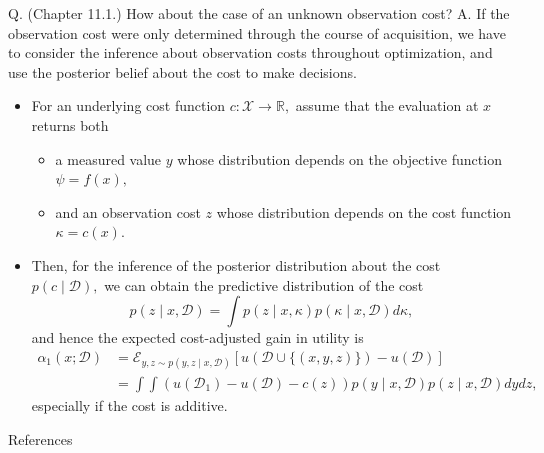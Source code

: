 \documentclass[9pt]{beamer}
\begin{document}
\begin{frame}
  Q. (Chapter 11.1.) How about the case of an unknown observation cost?
  \newline
  A. If the observation cost were only determined through the course of acquisition, we have to consider the inference about observation costs throughout optimization,
  and use the posterior belief about the cost to make decisions.
  \begin{itemize}
    \item For an underlying cost function $c: \mathcal{X} \rightarrow \mathbb{R},$ assume that
    the evaluation at $x$ returns both 
    \begin{itemize}
      \item a measured value $y$ whose distribution depends on the objective function $\psi = f(x),$
      \item and an observation cost $z$ whose distribution depends on the cost function $\kappa = c(x).$
    \end{itemize}
    \item[$\Rightarrow$] Then, for the inference of the posterior distribution about the cost $p(c \mid \mathcal{D}),$
    we can obtain the predictive distribution of the cost
    \[
      p(z \mid x, \mathcal{D}) = \int p(z \mid x, \kappa) p(\kappa \mid x, \mathcal{D}) d\kappa,
    \]
    and hence the expected cost-adjusted gain in utility is
    \[
      \begin{aligned}
        \alpha_1(x; \mathcal{D}) &= \mathcal{E}_{y,z \sim p(y,z \mid x, \mathcal{D})}[u(\mathcal{D} \cup \{(x, y, z)\}) - u(\mathcal{D})]\\
        &= \int \int (u(\mathcal{D}_1) - u(\mathcal{D}) - c(z)) p(y \mid x, \mathcal{D}) p(z \mid x, \mathcal{D}) dy dz,
      \end{aligned}
    \]
    especially if the cost is additive.
  \end{itemize} 
\end{frame}

\begin{frame}[allowframebreaks]{References}
\footnotesize


\end{frame}
\end{document}
